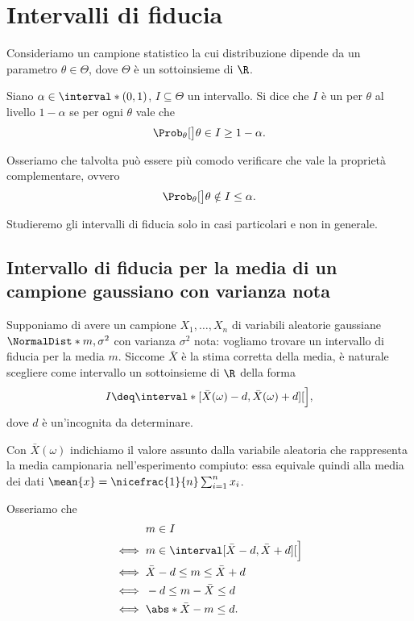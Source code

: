 \section{Intervalli di fiducia}

Consideriamo un campione statistico la cui distribuzione dipende da un parametro $\theta \in \Theta$, dove $\Theta$ è un sottoinsieme di $\R$.
\begin{definition}
    Siano $\alpha \in \interval*({0, 1})$, $I \subseteq \Theta$ un intervallo. Si dice che $I$ è un  per $\theta$ al livello $1 - \alpha$ se per ogni $\theta$ vale che \[
        \Prob_\theta[\big]{\theta \in I} \geq 1 - \alpha.    
    \]
\end{definition}

Osseriamo che talvolta può essere più comodo verificare che vale la proprietà complementare, ovvero \[
    \Prob_\theta[\big]{\theta \notin I} \leq \alpha.    
\]

Studieremo gli intervalli di fiducia solo in casi particolari e non in generale.

\subsection*{Intervallo di fiducia per la media di un campione gaussiano con varianza nota}

Supponiamo di avere un campione $X_1, \dots, X_n$ di variabili aleatorie gaussiane $\NormalDist*{m, \sigma^2}$ con varianza $\sigma^2$ nota: vogliamo trovare un intervallo di fiducia per la media $m$. 
Siccome $\bar X$ è la stima corretta della media, è naturale scegliere come intervallo un sottoinsieme di $\R$ della forma \[
    I \deq \interval*[{\bar X(\omega) - d, \bar X(\omega) + d}][\Big],    
\] dove $d$ è un'incognita da determinare. 

\begin{remark}
    Con $\bar X(\omega)$ indichiamo il valore assunto dalla variabile aleatoria che rappresenta la media campionaria nell'esperimento compiuto: essa equivale quindi alla media dei dati $\mean{x} = \nicefrac{1}{n}\sum_{i=1}^n x_i$.
\end{remark}

Osseriamo che 
\begin{align*}
    &m \in I\\
    \iff {}& m \in \interval[{\bar X - d, \bar X + d}][\Big]\\
    \iff {}& \bar X - d \leq m \leq \bar X + d\\
    \iff {}& -d \leq m - \bar X \leq d \\
    \iff {}& \abs*{\bar X - m} \leq d.
\end{align*}

